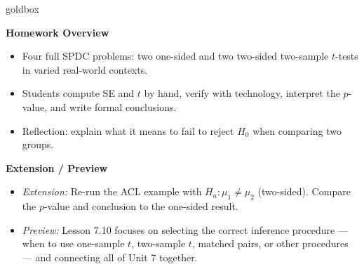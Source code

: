 \documentclass[10pt]{article}
\begin{document}
\begin{skillbox}{goldbox}
\begin{minipage}[t]{0.48\linewidth}
    \textbf{Homework Overview}
    \begin{itemize}
        \item Four full SPDC problems: two one-sided and two two-sided two-sample $t$-tests
              in varied real-world contexts.
        \item Students compute SE and $t$ by hand, verify with technology, interpret the
              $p$-value, and write formal conclusions.
        \item Reflection: explain what it means to fail to reject $H_0$ when comparing two groups.
    \end{itemize}
\end{minipage}
\hfill
\begin{minipage}[t]{0.48\linewidth}
    \textbf{Extension / Preview}
    \begin{itemize}
        \item \textit{Extension:} Re-run the ACL example with $H_a: \mu_1 \ne \mu_2$ (two-sided).
              Compare the $p$-value and conclusion to the one-sided result.
        \item \textit{Preview:} Lesson 7.10 focuses on selecting the correct inference
              procedure --- when to use one-sample $t$, two-sample $t$, matched pairs, or
              other procedures --- and connecting all of Unit 7 together.
    \end{itemize}
\end{minipage}
\end{skillbox}
\end{document}
